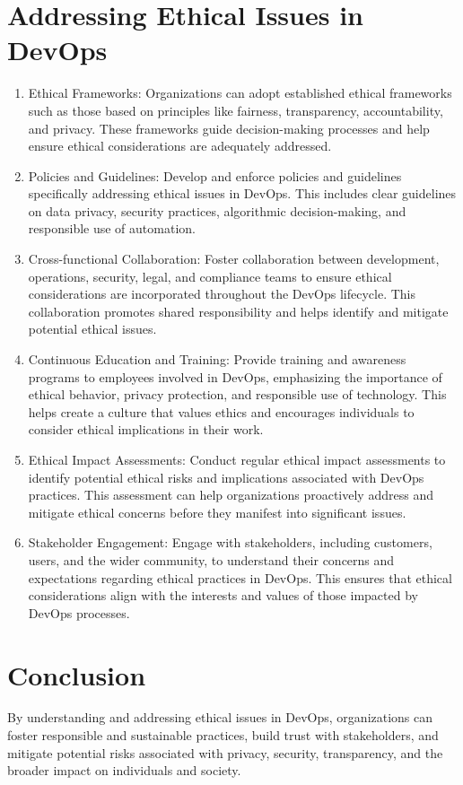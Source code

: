 \section*{Addressing Ethical Issues in DevOps}
\begin{enumerate}
    \item Ethical Frameworks: Organizations can adopt established ethical frameworks such as those based on principles like fairness, transparency, accountability, and privacy. These frameworks guide decision-making processes and help ensure ethical considerations are adequately addressed.


    \item Policies and Guidelines: Develop and enforce policies and guidelines specifically addressing ethical issues in DevOps. This includes clear guidelines on data privacy, security practices, algorithmic decision-making, and responsible use of automation.

    \item Cross-functional Collaboration: Foster collaboration between development, operations, security, legal, and compliance teams to ensure ethical considerations are incorporated throughout the DevOps lifecycle. This collaboration promotes shared responsibility and helps identify and mitigate potential ethical issues.

    \item Continuous Education and Training: Provide training and awareness programs to employees involved in DevOps, emphasizing the importance of ethical behavior, privacy protection, and responsible use of technology. This helps create a culture that values ethics and encourages individuals to consider ethical implications in their work.

    \item Ethical Impact Assessments: Conduct regular ethical impact assessments to identify potential ethical risks and implications associated with DevOps practices. This assessment can help organizations proactively address and mitigate ethical concerns before they manifest into significant issues.

    \item Stakeholder Engagement: Engage with stakeholders, including customers, users, and the wider community, to understand their concerns and expectations regarding ethical practices in DevOps. This ensures that ethical considerations align with the interests and values of those impacted by DevOps processes.

\end{enumerate}

\section*{Conclusion}

By understanding and addressing ethical issues in DevOps, organizations can foster responsible and sustainable practices, build trust with stakeholders, and mitigate potential risks associated with privacy, security, transparency, and the broader impact on individuals and society.